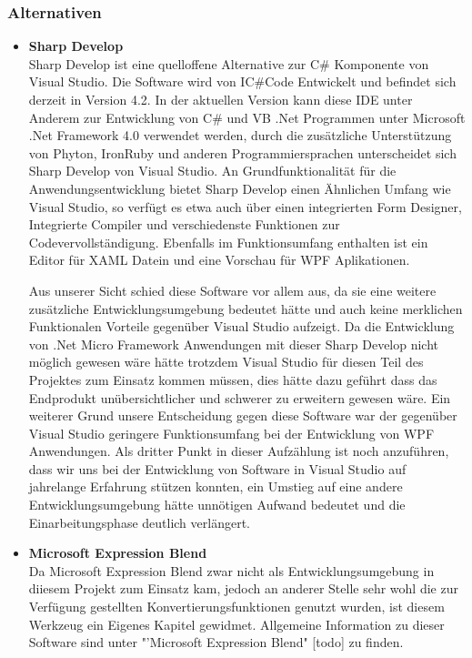 \subsubsection{Alternativen}
\begin{itemize}
\item \textbf{Sharp Develop}\\
Sharp Develop ist eine quelloffene Alternative zur C\# Komponente von Visual Studio. Die Software wird von IC\#Code Entwickelt und befindet sich derzeit in Version 4.2.
In der aktuellen Version kann diese IDE unter Anderem zur Entwicklung von C\# und VB .Net Programmen unter Microsoft .Net Framework 4.0 verwendet werden, durch die zusätzliche Unterstützung von Phyton, IronRuby und anderen Programmiersprachen unterscheidet sich Sharp Develop von Visual Studio.
An Grundfunktionalität für die Anwendungsentwicklung bietet Sharp Develop einen Ähnlichen Umfang wie Visual Studio, so verfügt es etwa auch über einen integrierten Form Designer, Integrierte Compiler und verschiedenste Funktionen zur Codevervollständigung. Ebenfalls im Funktionsumfang enthalten ist ein Editor für XAML Datein und eine Vorschau für WPF Aplikationen.

Aus unserer Sicht schied diese Software vor allem aus, da sie eine weitere zusätzliche Entwicklungsumgebung bedeutet hätte und auch keine merklichen Funktionalen Vorteile gegenüber Visual Studio aufzeigt.
Da die Entwicklung von .Net Micro Framework Anwendungen mit dieser Sharp Develop nicht möglich gewesen wäre hätte trotzdem Visual Studio für diesen Teil des Projektes zum Einsatz kommen müssen, dies hätte dazu geführt dass das Endprodukt unübersichtlicher und schwerer zu erweitern gewesen wäre.
Ein weiterer Grund unsere Entscheidung gegen diese Software war der gegenüber Visual Studio geringere Funktionsumfang bei der Entwicklung von WPF Anwendungen.
Als dritter Punkt in dieser Aufzählung ist noch anzuführen, dass wir uns bei der Entwicklung von Software in Visual Studio auf jahrelange Erfahrung stützen konnten, ein Umstieg auf eine andere Entwicklungsumgebung hätte unnötigen Aufwand bedeutet und die Einarbeitungsphase deutlich verlängert.
\item \textbf{Microsoft Expression Blend}\\
Da Microsoft Expression Blend zwar nicht als Entwicklungsumgebung in diiesem Projekt zum Einsatz kam, jedoch an anderer Stelle sehr wohl die zur Verfügung gestellten Konvertierungsfunktionen genutzt wurden, ist diesem Werkzeug ein Eigenes Kapitel gewidmet. Allgemeine Information zu dieser Software sind unter "'Microsoft Expression Blend" [todo] zu finden.


\end{itemize}

